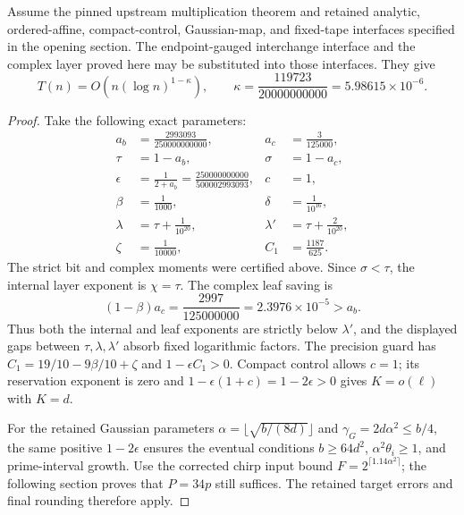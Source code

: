 \begin{theorem}
Assume the pinned upstream multiplication theorem and retained analytic,
ordered-affine, compact-control, Gaussian-map, and fixed-tape interfaces
specified in the opening section. The endpoint-gauged interchange interface
and the complex layer proved here may be substituted into those
interfaces. They give
\[
 T(n)=O\!\left(n(\log n)^{1-\kappa}\right),\qquad
 \boxed{\kappa=\frac{119723}{20000000000}
                 =5.98615\times10^{-6}}.
\]
\end{theorem}
\begin{proof}
Take the following exact parameters:
\[
\begin{aligned}
 a_b&=\frac{2993093}{250000000000},&a_c&=\frac{3}{125000},\\
 \tau&=1-a_b,&\sigma&=1-a_c,\\
 \epsilon&=\frac1{2+a_b}=\frac{250000000000}{500002993093},&c&=1,\\
 \beta&=\frac1{1000},&\delta&=\frac1{10^{16}},\\
 \lambda&=\tau+\frac1{10^{20}},&\lambda'&=\tau+\frac2{10^{20}},\\
 \zeta&=\frac1{10000},&C_1&=\frac{1187}{625}.
\end{aligned}
\]
The strict bit and complex moments were certified above. Since
$\sigma<\tau$, the internal layer exponent is $\chi=\tau$.
The complex leaf saving is
\[
 (1-\beta)a_c=\frac{2997}{125000000}=2.3976\times10^{-5}>a_b.
\]
Thus both the internal and leaf exponents are strictly below
$\lambda'$, and the displayed gaps between $\tau,\lambda,\lambda'$
absorb fixed logarithmic factors. The precision guard has
$C_1=19/10-9\beta/10+\zeta$ and $1-\epsilon C_1>0$.
Compact control allows $c=1$; its reservation exponent is zero and
$1-\epsilon(1+c)=1-2\epsilon>0$ gives $K=o(\ell)$ with $K=d$.

For the retained Gaussian parameters
$\alpha=\lfloor\sqrt{b/(8d)}\rfloor$ and
$\gamma_G=2d\alpha^2\le b/4$, the same positive $1-2\epsilon$
ensures the eventual conditions $b\ge64d^2$, $\alpha^2\theta_i\ge1$,
and prime-interval growth. Use the corrected chirp input bound
$F=2^{\lceil1.14\alpha^2\rceil}$; the following section proves that
$P=34p$ still suffices. The retained target errors and final rounding
therefore apply.


\end{proof}
